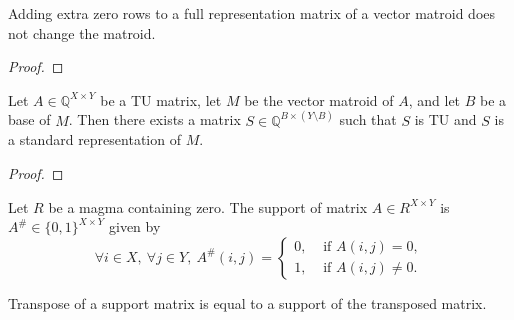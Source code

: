 
\begin{lemma}
    \label{Matrix.fromRows_zero_reindex_toMatroid}
    \leanok
    Adding extra zero rows to a full representation matrix of a vector matroid does not change the matroid.
\end{lemma}

\begin{proof}
    \leanok
    \SeeLean
\end{proof}

\begin{lemma}
    \label{VectorMatroid.exists_standardRepr_isBase_isTotallyUnimodular}
    \leanok
    Let $A \in \mathbb{Q}^{X \times Y}$ be a TU matrix, let $M$ be the vector matroid of $A$, and let $B$ be a base of $M$. Then there exists a matrix $S \in \mathbb{Q}^{B \times (Y \setminus B)}$ such that $S$ is TU and $S$ is a standard representation of $M$.
\end{lemma}

\begin{proof}
    \leanok
    \SeeLean
\end{proof}


\begin{definition}
    \label{Matrix.support}
    \leanok
    Let $R$ be a magma containing zero. The support of matrix $A \in R^{X \times Y}$ is $A^{\#} \in \{0, 1\}^{X \times Y}$ given by
    \[
        \forall i \in X, \ \forall j \in Y, \ A^{\#} (i, j) = \begin{cases}
            0, & \text{ if } A (i, j) = 0, \\
            1, & \text{ if } A (i, j) \neq 0.
        \end{cases}
    \]
\end{definition}

\begin{lemma}
    \label{Matrix.support_transpose}
    \leanok
    Transpose of a support matrix is equal to a support of the transposed matrix.
\end{lemma}

